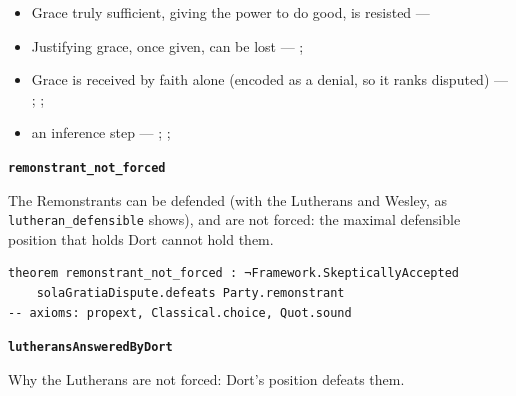 \documentclass[11pt]{article}
\begin{document}
\begin{itemize}
\begin{itemize}
\item Grace truly sufficient, giving the power to do good, is resisted --- \cite[ch. VI]{garrigou-lagrange-grace-1952}
\item Justifying grace, once given, can be lost --- \cite[II-II q.24 a.11]{aquinas-summa-1920}; \cite[Trent, Session VI (1547), canon 23]{tanner-decrees-1990}
\item Grace is received by faith alone (encoded as a denial, so it ranks disputed) --- \cite[II-II q.4 a.3]{aquinas-summa-1920}; \cite[I-II q.113 a.4 ad 1]{aquinas-summa-1920}; \cite[Trent, Session VI (1547), canon 9]{tanner-decrees-1990}
\item an inference step --- \cite{pohle-molinism-1911}; \cite[I-II q.112 a.3]{aquinas-summa-1920}; \cite[ch. VII]{garrigou-lagrange-grace-1952}
\end{itemize}
\end{itemize}
\par\medskip\noindent\textbf{\texttt{remonstrant\_\allowbreak{}not\_\allowbreak{}forced}}\par\nobreak\noindent
The Remonstrants can be defended (with the Lutherans and Wesley, as \texttt{lutheran\_\allowbreak{}defensible} shows), and are not forced: the maximal defensible position that holds Dort cannot hold them.

{\small\begin{verbatim}
theorem remonstrant_not_forced : ¬Framework.SkepticallyAccepted
    solaGratiaDispute.defeats Party.remonstrant
-- axioms: propext, Classical.choice, Quot.sound
\end{verbatim}}
\par\medskip\noindent\textbf{\texttt{lutherans\allowbreak{}Answered\allowbreak{}By\allowbreak{}Dort}}\par\nobreak\noindent
Why the Lutherans are not forced: Dort’s position defeats them.
\end{document}

